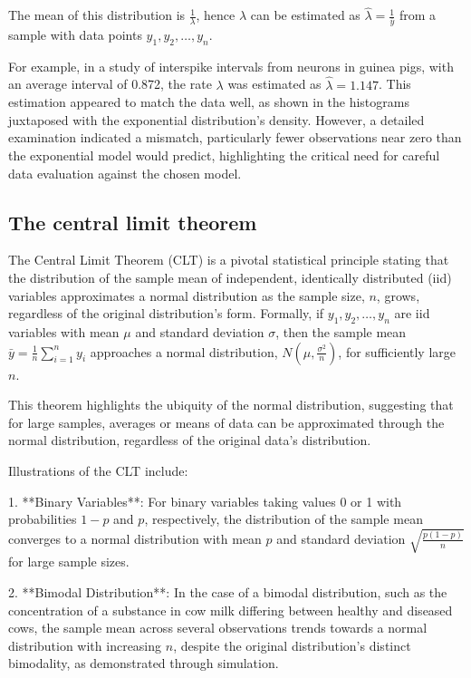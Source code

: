 \documentclass{article}
\begin{document}
The mean of this distribution is \(\frac{1}{\lambda}\), hence \(\lambda\) can be estimated as \(\hat{\lambda} = \frac{1}{\bar{y}}\) from a sample with data points \(y_1, y_2, \ldots, y_n\).

For example, in a study of interspike intervals from neurons in guinea pigs, with an average interval of 0.872, the rate \(\lambda\) was estimated as \(\hat{\lambda} = 1.147\). This estimation appeared to match the data well, as shown in the histograms juxtaposed with the exponential distribution's density. However, a detailed examination indicated a mismatch, particularly fewer observations near zero than the exponential model would predict, highlighting the critical need for careful data evaluation against the chosen model.

\subsection{The central limit theorem}
The Central Limit Theorem (CLT) is a pivotal statistical principle stating that the distribution of the sample mean of independent, identically distributed (iid) variables approximates a normal distribution as the sample size, \(n\), grows, regardless of the original distribution's form. Formally, if \(y_1, y_2, \ldots, y_n\) are iid variables with mean \(\mu\) and standard deviation \(\sigma\), then the sample mean \(\bar{y} = \frac{1}{n} \sum_{i=1}^{n} y_i\) approaches a normal distribution, \(N\left(\mu, \frac{\sigma^2}{n}\right)\), for sufficiently large \(n\).

This theorem highlights the ubiquity of the normal distribution, suggesting that for large samples, averages or means of data can be approximated through the normal distribution, regardless of the original data's distribution.

Illustrations of the CLT include:

1. **Binary Variables**: For binary variables taking values 0 or 1 with probabilities \(1-p\) and \(p\), respectively, the distribution of the sample mean converges to a normal distribution with mean \(p\) and standard deviation \(\sqrt{\frac{p(1-p)}{n}}\) for large sample sizes.

2. **Bimodal Distribution**: In the case of a bimodal distribution, such as the concentration of a substance in cow milk differing between healthy and diseased cows, the sample mean across several observations trends towards a normal distribution with increasing \(n\), despite the original distribution's distinct bimodality, as demonstrated through simulation.
\end{document}
